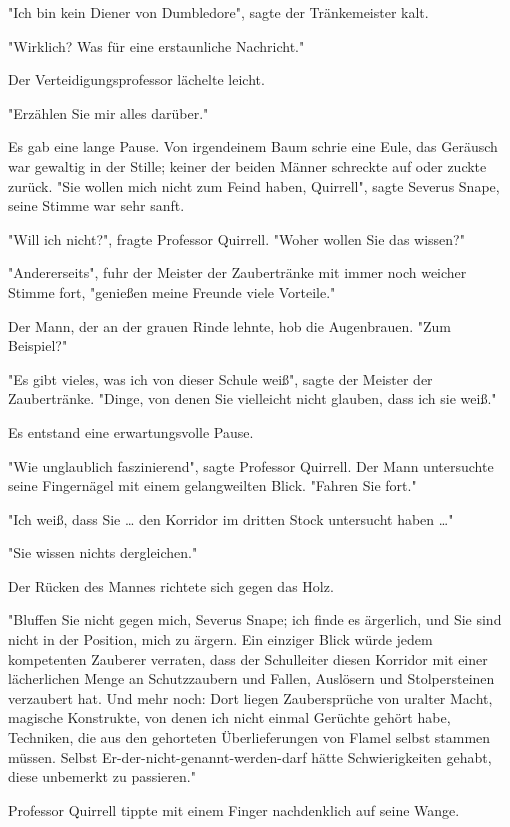 {"Ich bin kein Diener von Dumbledore", sagte der Tränkemeister kalt.

"Wirklich? Was für eine erstaunliche Nachricht."

Der Verteidigungsprofessor lächelte leicht.

"Erzählen Sie mir alles darüber."

Es gab eine lange Pause. Von irgendeinem Baum schrie eine Eule, das Geräusch war gewaltig in der Stille; keiner der beiden Männer schreckte auf oder zuckte zurück. "Sie wollen mich nicht zum Feind haben, Quirrell", sagte Severus Snape, seine Stimme war sehr sanft.

"Will ich nicht?", fragte Professor Quirrell. "Woher wollen Sie das wissen?"

"Andererseits", fuhr der Meister der Zaubertränke mit immer noch weicher Stimme fort, "genießen meine Freunde viele Vorteile."

Der Mann, der an der grauen Rinde lehnte, hob die Augenbrauen. "Zum Beispiel?"

"Es gibt vieles, was ich von dieser Schule weiß", sagte der Meister der Zaubertränke. "Dinge, von denen Sie vielleicht nicht glauben, dass ich sie weiß."

Es entstand eine erwartungsvolle Pause.

"Wie unglaublich faszinierend", sagte Professor Quirrell. Der Mann untersuchte seine Fingernägel mit einem gelangweilten Blick. "Fahren Sie fort."

"Ich weiß, dass Sie … den Korridor im dritten Stock untersucht haben …"

"Sie wissen nichts dergleichen."

Der Rücken des Mannes richtete sich gegen das Holz.

"Bluffen Sie nicht gegen mich, Severus Snape; ich finde es ärgerlich, und Sie sind nicht in der Position, mich zu ärgern. Ein einziger Blick würde jedem kompetenten Zauberer verraten, dass der Schulleiter diesen Korridor mit einer lächerlichen Menge an Schutzzaubern und Fallen, Auslösern und Stolpersteinen verzaubert hat. Und mehr noch: Dort liegen Zaubersprüche von uralter Macht, magische Konstrukte, von denen ich nicht einmal Gerüchte gehört habe, Techniken, die aus den gehorteten Überlieferungen von Flamel selbst stammen müssen. Selbst Er-der-nicht-genannt-werden-darf hätte Schwierigkeiten gehabt, diese unbemerkt zu passieren."

Professor Quirrell tippte mit einem Finger nachdenklich auf seine Wange.

}
